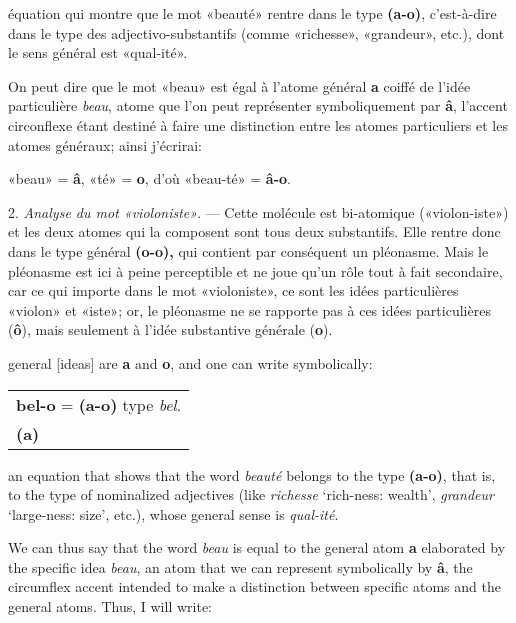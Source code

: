 \begin{sloppypar}
{  \noindent
  équation qui montre que le mot «beauté» rentre dans le type
  \textbf{(a-o)}, c’est-à-dire dans le type des adjectivo-substantifs
  (comme «richesse», «grandeur», etc.), dont le sens général est
  «qual-ité».

  On peut dire que le mot «beau» est égal à l’atome général \textbf{a}
  coiffé de l’idée particulière \emph{beau}, atome que l’on peut
  représenter symboliquement par \textbf{â}, l’accent circonflexe
  étant destiné à faire une distinction entre les atomes particuliers
  et les atomes généraux; ainsi j’écrirai:

  \begin{center}
    {\small «beau» = \textbf{â}, «té» = \textbf{o}, d’où «beau-té» =
      \textbf{â-o}.}
  \end{center}


  2. \emph{Analyse du mot «violoniste»}. — Cette molécule est
  bi-atomique («violon-iste») et les deux atomes qui la composent sont
  tous deux substantifs. Elle rentre donc dans le type général
  \textbf{(o-o),} qui contient par conséquent un pléonasme. Mais le
  pléonasme est ici à peine perceptible et ne joue qu’un rôle tout à
  fait secondaire, car ce qui importe dans le mot «violoniste», ce
  sont les idées particulières «violon» et «iste»; or, le pléonasme ne
  se rapporte pas à ces idées particulières (\textbf{ô}), mais
  seulement à l’idée substantive générale (\textbf{o}).

}
%
{
  \noindent
  general [ideas] are \textbf{a} and \textbf{o}, and one can write
  symbolically:

  \begin{center}
    \begin{tabular}[t]{l}
      \textbf{bel-o} = \textbf{(a-o)} type \emph{bel}.\\
      \textbf{(a)}
    \end{tabular}
  \end{center}

  \noindent
  an equation that shows that the word \emph{beauté} belongs to the
  type \textbf{(a-o)}, that is, to the type of nominalized adjectives
  (like \emph{richesse} `rich-ness: wealth', \emph{grandeur} `large-ness:
  size', etc.), whose general sense is \emph{qual-ité}.

  We can thus say that the word \emph{beau} is equal to the general atom
  \textbf{a} elaborated by the specific idea \emph{beau}, an atom that
  we can represent symbolically by \textbf{â}, the circumflex accent
  intended to make a distinction between specific atoms and the
  general atoms.  Thus, I will write:

}
\end{sloppypar}
